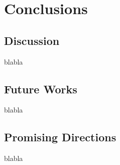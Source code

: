%

\chapter{Conclusions}


\section{Discussion}

blabla


\section{Future Works}

blabla


\section{Promising Directions}

blabla

%





